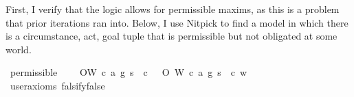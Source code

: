 \begin{isabellebody}
\begin{isamarkuptext}
First, I verify that the logic allows
for permissible maxims, as this is a problem that prior iterations ran into. Below, I use Nitpick to 
find a model in which there is a circumstance, act, goal tuple that is permissible but not 
obligated at some world.%
\end{isamarkuptext}\isamarkuptrue%
\isamarkupfalse%
\ permissible{\isacharcolon}\isanewline
\ \ \ {\isachardoublequoteopen}{\isacharparenleft}{\isacharparenleft}\isactrlbold {\isasymnot}\ {\isacharparenleft}O{\isacharbraceleft}{\isacharparenleft}W\ {\isacharparenleft}c{\isacharcomma}\ a{\isacharcomma}\ g{\isacharparenright}\ s{\isacharparenright}\ {\isacharbar}\ c{\isacharbraceright}{\isacharparenright}{\isacharparenright}\ \isactrlbold {\isasymand}\ {\isacharparenleft}\isactrlbold {\isasymnot}\ {\isacharparenleft}O{\isacharbraceleft}\isactrlbold {\isasymnot}\ {\isacharparenleft}W\ {\isacharparenleft}c{\isacharcomma}\ a{\isacharcomma}\ g{\isacharparenright}\ s{\isacharparenright}\ {\isacharbar}\ c{\isacharbraceright}{\isacharparenright}{\isacharparenright}{\isacharparenright}\ w{\isachardoublequoteclose}\isanewline
\ \ \isamarkupfalse%
\ {\isacharbrackleft}user{\isacharunderscore}axioms{\isacharcomma}\ falsify{\isacharequal}false{\isacharbrackright}%
\isadelimproof
\ %
\endisadelimproof
%
\isatagproof
{}\isamarkupfalse%
\isanewline
%
\end{isabellebody}
